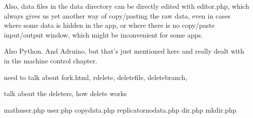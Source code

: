 Also, data files in the data directory can be directly edited with editor.php, which always gives us yet another way of copy/pasting the raw data, even in cases where some data is hidden in the app, or where there is no copy/paste input/output window, which might be inconvenient for some apps.


Also Python.  And Adruino, but that's just mentioned here and really dealt with in the machine control chapter.

need to talk about fork.html, rdelete, deletefile, deletebranch,

talk about the deleters, how delete works

mathuser.php
user.php
copydata.php
replicatornodata.php
dir.php
mkdir.php
